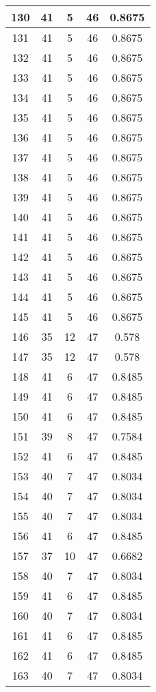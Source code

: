 \documentclass[letterpaper, 12pt]{article}
\begin{document}
\begin{longtable}{|c|c|c|c|c|}
\hline
130 & 41 & 5 & 46 & 0.8675 \\
\hline
131 & 41 & 5 & 46 & 0.8675 \\
\hline
132 & 41 & 5 & 46 & 0.8675 \\
\hline
133 & 41 & 5 & 46 & 0.8675 \\
\hline
134 & 41 & 5 & 46 & 0.8675 \\
\hline
135 & 41 & 5 & 46 & 0.8675 \\
\hline
136 & 41 & 5 & 46 & 0.8675 \\
\hline
137 & 41 & 5 & 46 & 0.8675 \\
\hline
138 & 41 & 5 & 46 & 0.8675 \\
\hline
139 & 41 & 5 & 46 & 0.8675 \\
\hline
140 & 41 & 5 & 46 & 0.8675 \\
\hline
141 & 41 & 5 & 46 & 0.8675 \\
\hline
142 & 41 & 5 & 46 & 0.8675 \\
\hline
143 & 41 & 5 & 46 & 0.8675 \\
\hline
144 & 41 & 5 & 46 & 0.8675 \\
\hline
145 & 41 & 5 & 46 & 0.8675 \\
\hline
146 & 35 & 12 & 47 & 0.578 \\
\hline
147 & 35 & 12 & 47 & 0.578 \\
\hline
148 & 41 & 6 & 47 & 0.8485 \\
\hline
149 & 41 & 6 & 47 & 0.8485 \\
\hline
150 & 41 & 6 & 47 & 0.8485 \\
\hline
151 & 39 & 8 & 47 & 0.7584 \\
\hline
152 & 41 & 6 & 47 & 0.8485 \\
\hline
153 & 40 & 7 & 47 & 0.8034 \\
\hline
154 & 40 & 7 & 47 & 0.8034 \\
\hline
155 & 40 & 7 & 47 & 0.8034 \\
\hline
156 & 41 & 6 & 47 & 0.8485 \\
\hline
157 & 37 & 10 & 47 & 0.6682 \\
\hline
158 & 40 & 7 & 47 & 0.8034 \\
\hline
159 & 41 & 6 & 47 & 0.8485 \\
\hline
160 & 40 & 7 & 47 & 0.8034 \\
\hline
161 & 41 & 6 & 47 & 0.8485 \\
\hline
162 & 41 & 6 & 47 & 0.8485 \\
\hline
163 & 40 & 7 & 47 & 0.8034 \\

\end{longtable}
\end{document}
